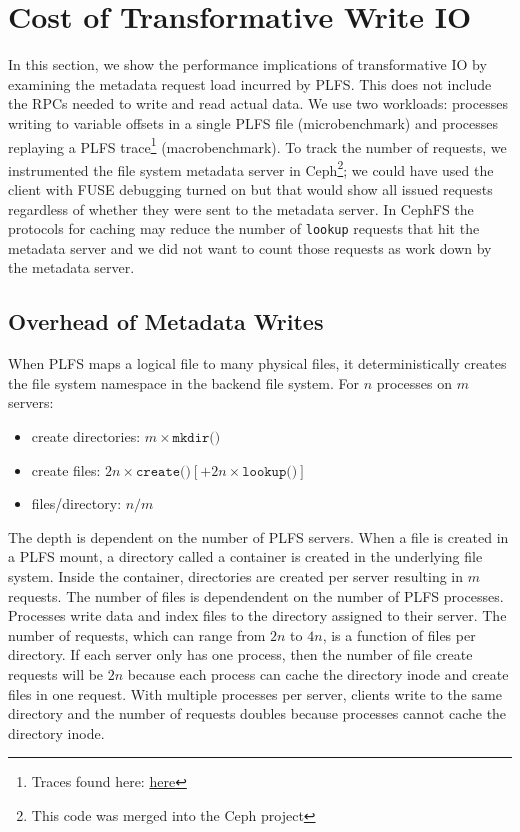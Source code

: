 \section{Cost of Transformative Write IO}

In this section, we show the performance implications of transformative IO by
examining the metadata request load incurred by PLFS. This does not include the
RPCs needed to write and read actual data. We use two workloads: processes
writing to variable offsets in a single PLFS file (microbenchmark) and
processes replaying a PLFS trace\footnote{Traces found here:
\href{https://web.archive.org/web/20140419194914/http://institutes.lanl.gov/plfs/maps/}{here}}
(macrobenchmark). To track the number of requests, we instrumented the file
system metadata server in Ceph\footnote{This code was merged into the Ceph
project}; we could have used the client with FUSE debugging turned on but that
would show all issued requests regardless of whether they were sent to the
metadata server. In CephFS the protocols for caching may reduce the number of
\texttt{lookup} requests that hit the metadata server and we did not want to
count those requests as work down by the metadata server.

\subsection{Overhead of Metadata Writes}
When PLFS maps a logical file to many physical files, it deterministically
creates the file system namespace in the backend file system.  For \(n\)
processes on \(m\) servers:

\begin{itemize}
  \item create directories: \(m \times \texttt{mkdir()}\)
  \item create files: \(2n \times \texttt{create()} [+ 2n \times \texttt{lookup()}]\)
  \item files/directory: \(n/m\)
\end{itemize}

The depth is dependent on the number of PLFS servers. When a file is created in
a PLFS mount, a directory called a container is created in the underlying file
system. Inside the container, directories are created per server resulting in
\(m\) requests. The number of files is dependendent on the number of PLFS
processes. Processes write data and index files to the directory assigned to
their server. The number of requests, which can range from \(2n\) to \(4n\), is
a function of files per directory.  If each server only has one process, then
the number of file create requests will be \(2n\) because each process can
cache the directory inode and create files in one request. With multiple
processes per server, clients write to the same directory and the number of
requests doubles because processes cannot cache the directory inode.


